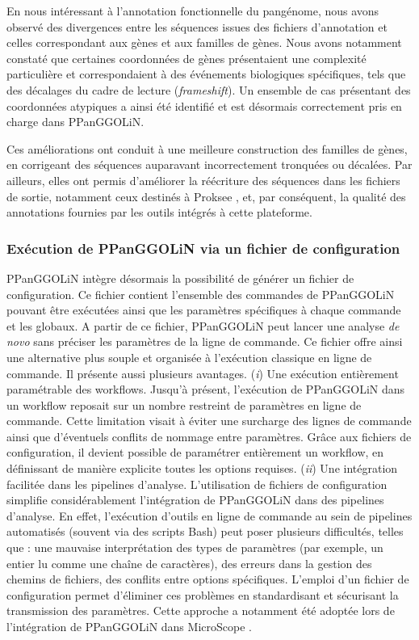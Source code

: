 En nous intéressant à l'annotation fonctionnelle du pangénome, nous avons observé des divergences entre les séquences issues des fichiers d'annotation et celles correspondant aux gènes et aux familles de gènes. Nous avons notamment constaté que certaines coordonnées de gènes présentaient une complexité particulière et correspondaient à des événements biologiques spécifiques, tels que des décalages du cadre de lecture (\textit{frameshift}). Un ensemble de cas présentant des coordonnées atypiques a ainsi été identifié et est désormais correctement pris en charge dans PPanGGOLiN.

Ces améliorations ont conduit à une meilleure construction des familles de gènes, en corrigeant des séquences auparavant incorrectement tronquées ou décalées. Par ailleurs, elles ont permis d'améliorer la réécriture des séquences dans les fichiers de sortie, notamment ceux destinés à Proksee \cite{grant_proksee_2023}, et, par conséquent, la qualité des annotations fournies par les outils intégrés à cette plateforme.

\newpage

\subsubsection{Exécution de PPanGGOLiN via un fichier de configuration}

PPanGGOLiN intègre désormais la possibilité de générer un fichier de configuration. Ce fichier contient l’ensemble des commandes de PPanGGOLiN pouvant être exécutées ainsi que les paramètres spécifiques à chaque commande et les  globaux. A partir de ce fichier, PPanGGOLiN peut lancer une analyse \textit{de novo} sans préciser les paramètres de la ligne de commande. Ce fichier offre ainsi une alternative plus souple et organisée à l’exécution classique en ligne de commande. Il présente aussi plusieurs avantages.
(\textit{i}) Une exécution entièrement paramétrable des workflows. Jusqu’à présent, l’exécution de PPanGGOLiN dans un workflow reposait sur un nombre restreint de paramètres en ligne de commande. Cette limitation visait à éviter une surcharge des lignes de commande ainsi que d’éventuels conflits de nommage entre paramètres. Grâce aux fichiers de configuration, il devient possible de paramétrer entièrement un workflow, en définissant de manière explicite toutes les options requises. 
(\textit{ii}) Une intégration facilitée dans les pipelines d’analyse. L’utilisation de fichiers de configuration simplifie considérablement l’intégration de PPanGGOLiN dans des pipelines d’analyse. En effet, l’exécution d’outils en ligne de commande au sein de pipelines automatisés (souvent via des scripts Bash) peut poser plusieurs difficultés, telles que : une mauvaise interprétation des types de paramètres (par exemple, un entier lu comme une chaîne de caractères), des erreurs dans la gestion des chemins de fichiers, des conflits entre options spécifiques. L’emploi d’un fichier de configuration permet d’éliminer ces problèmes en standardisant et sécurisant la transmission des paramètres. Cette approche a notamment été adoptée lors de l’intégration de PPanGGOLiN dans MicroScope \cite{vallenet_microscope_2020}.

